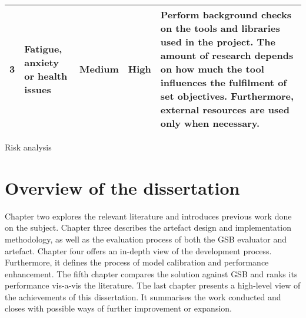 \begin{singlespace}
\begin{center}
\begin{tabular}{ | m{0.5em} | m{7em} | m{5em} | m{3.2em}| m{17.5em} | }
			\textbf{3}  &
			Fatigue, anxiety or health issues
			            &
			Medium
			            &
			High
			            &
			Perform background checks on the tools and libraries used in the project. The amount of research depends on how much the tool influences the fulfilment of set objectives. Furthermore, external resources are used only when necessary. \\
			\hline
		\end{tabular}
		\captionsetup{type=table}\caption{Risk analysis}
	\end{center}
\end{singlespace}

\section{Overview of the dissertation}
\label{sec:overview_of_the_dissertation}
Chapter two explores the relevant literature and introduces previous work done on the subject. Chapter three describes the artefact design and implementation methodology, as well as the evaluation process of both the GSB evaluator and artefact. Chapter four offers an in-depth view of the development process. Furthermore, it defines the process of model calibration and performance enhancement. The fifth chapter compares the solution against GSB and ranks its performance vis-a-vis the literature. The last chapter presents a high-level view of the achievements of this dissertation. It summarises the work conducted and closes with possible ways of further improvement or expansion.
